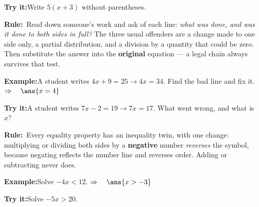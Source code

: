 \documentclass[12pt]{article}
\begin{document}
\begin{tryitbox}\textbf{Try it:}\quad Write $5(x+3)$ without parentheses.\\[2pt]
\end{tryitbox}


\begin{formulabox}\textbf{Rule:}\ Read down someone's work and ask of each
line: \emph{what was done, and was it done to both sides in full?} The three
usual offenders are a change made to one side only, a partial distribution, and
a division by a quantity that could be zero. Then substitute the answer into
the \textbf{original} equation --- a legal chain always survives that test.
\end{formulabox}

\begin{examplebox}\textbf{Example:}\quad A student writes
$4x + 9 = 25 \to 4x = 34$. Find the bad line and fix it.
$\Rightarrow\quad \ans{x = 4}$
\end{examplebox}

\begin{tryitbox}\textbf{Try it:}\quad A student writes
$7x - 2 = 19 \to 7x = 17$. What went wrong, and what is $x$?\\[2pt]
\end{tryitbox}


\begin{formulabox}\textbf{Rule:}\ Every equality property has an inequality
twin, with one change: multiplying or dividing both sides by a
\textbf{negative} number \emph{reverses} the symbol, because negating reflects
the number line and reverses order. Adding or subtracting never does.
\end{formulabox}

\begin{examplebox}\textbf{Example:}\quad Solve $-4x < 12$.
$\Rightarrow\quad \ans{x > -3}$
\end{examplebox}

\begin{tryitbox}\textbf{Try it:}\quad Solve $-5x > 20$.\\[2pt]
\end{tryitbox}
\end{document}
